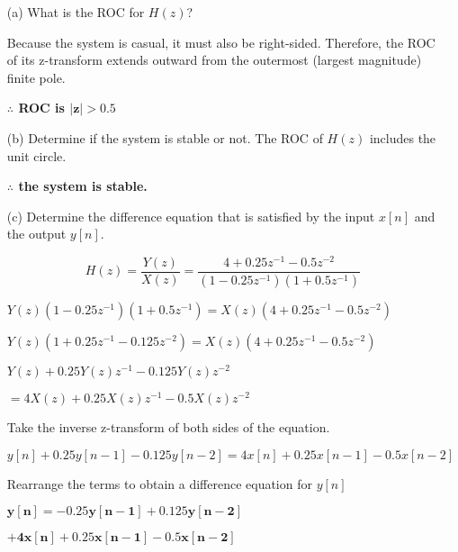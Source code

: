 \documentclass[fleqn]{article}
\begin{document}
\begin{enumerate}[nolistsep]
			\begin{enumerate}[nolistsep]
				\item[(a)] What is the ROC for $H(z)$?
				
					Because the system is casual, it must also be right-sided. Therefore, the ROC of its z-transform extends outward from
the outermost (largest magnitude) finite pole.

					\textbf{$\mathbf{\therefore}$ ROC is $\mathbf{|z| > 0.5}$}
					
				\item[(b)] Determine if the system is stable or not.
					The ROC of $H(z)$ includes the unit circle.
				
					\textbf{$\mathbf{\therefore}$ the system is stable.}
				 
				 \item[(c)] Determine the difference equation that is satisfied by the input $x[n]$ and the output $y[n]$.
				 
				 	\begin{equation*}
				 		H(z) = \frac{Y(z)}{X(z)} = \frac{4 + 0.25z^{-1}-0.5z^{-2}}{(1-0.25z^{-1})(1 + 0.5z^{-1})}
				 	\end{equation*}
				 	
				 	$Y(z)(1-0.25z^{-1})(1 + 0.5z^{-1}) = X(z)(4 + 0.25z^{-1}-0.5z^{-2})$
				 	
				 	$Y(z)(1 + 0.25z^{-1} - 0.125z^{-2}) = X(z)(4 + 0.25z^{-1}-0.5z^{-2})$
				 	
				 	$Y(z) + 0.25Y(z)z^{-1} - 0.125Y(z)z^{-2}$
				 	
				 	$= 4X(z) + 0.25X(z)z^{-1}-0.5X(z)z^{-2}$
				 	
				 	Take the inverse z-transform of both sides of the equation.
				 	
				 	$y[n] + 0.25y[n-1] - 0.125y[n-2] = 4x[n] + 0.25x[n-1] - 0.5x[n-2]$
				 	
				 	Rearrange the terms to obtain a difference equation for $y[n]$
				 	
				 	$\mathbf{y[n] = -0.25y[n-1] + 0.125y[n-2]}$
				 	
				 	$\mathbf{ + 4x[n] + 0.25x[n-1] - 0.5x[n-2]}$
			\end{enumerate}
	\end{enumerate}
	
\end{document}
